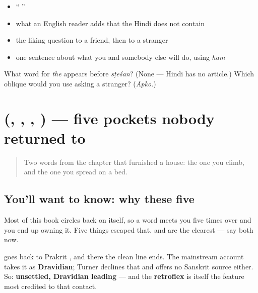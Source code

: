 \begin{itemize}
\raggedright
  \item \textquotedblleft{}   \textquotedblright{}
  \item what an English reader adds that the Hindi does not contain
  \item the liking question to a friend, then to a stranger
  \item one sentence about what you and somebody else will do, using \emph{ham}
\end{itemize}

\begin{tcolorbox}[breakable,colback=teal!4,colframe=teal!35!black,title={Before you move on}]
What word for \emph{the} appears before \emph{sṭeśan}? (None — Hindi has no article.) Which oblique would you use asking a stranger? (\emph{Āpko}.)
\end{tcolorbox}
\section[\texorpdfstring{(\hi{पेट}, \hi{औरत}, \hi{सीढ़ी}, \hi{चादर})}{(पेट, औरत, सीढ़ी, चादर)}]{(, , , ) — five pockets nobody returned to}

\label{lesson:HI-R94-met-once-and-left-there}



\begin{quote}
Two words from the chapter that furnished a house: the one you climb, and the one you spread on a bed.
\end{quote}

\subsection*{You'll want to know: why these five}
Most of this book circles back on itself, so a word meets you five times over and you end up owning it. Five things escaped that. \textbf{  } and \textbf{  } are the clearest — say both now.

\begin{cousinweb}
\textbf{} goes back to Prakrit \textbf{}, and there the clean line ends. The mainstream account takes it as \textbf{Dravidian}; Turner declines that and offers no Sanskrit source either. So: \textbf{unsettled, Dravidian leading} — and the \textbf{retroflex } is itself the feature most credited to that contact.
\end{cousinweb}


